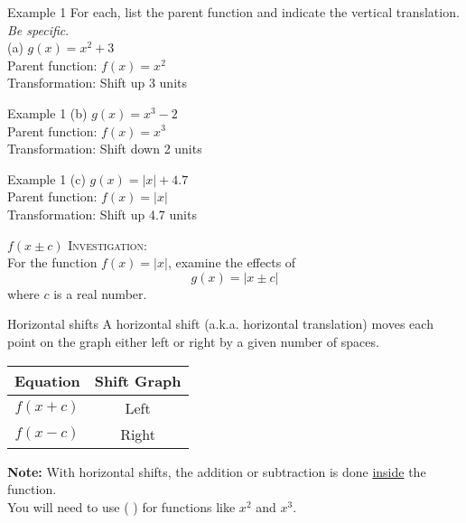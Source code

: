 \documentclass[t]{beamer}
\begin{document}
\begin{frame}{Example 1}
For each, list the parent function and indicate the vertical translation. \emph{Be specific}.	\newline\\	
(a) \quad $g(x) = x^2 + 3$	\newline\\	\pause
Parent function: $f(x) = x^2$	\newline\\	\pause
Transformation: Shift up 3 units
\end{frame}

\begin{frame}{Example 1}
(b) \quad $g(x) = x^3 - 2$	\newline\\	\pause
Parent function: $f(x) = x^3$	\newline\\	\pause
Transformation: Shift down 2 units
\end{frame}

\begin{frame}{Example 1}
(c) \quad $g(x) = |x| + 4.7$	\newline\\	\pause
Parent function: $f(x) = |x|$	\newline\\	\pause
Transformation: Shift up 4.7 units
\end{frame}

\begin{frame}{$f(x \pm c)$}
\textsc{Investigation:}	\newline\\

For the function $f(x) = |x|$, examine the effects of
\[g(x) = |x \pm c| \]
where $c$ is a real number.
\end{frame}

\begin{frame}{Horizontal shifts}
A \alert{horizontal shift} (a.k.a. \alert{horizontal translation}) moves each point on the graph either left or right by a given number of spaces.	\newline\\	\pause
\begin{center}
\setlength{\extrarowheight}{6pt}
\begin{tabular}{c|c}
\textbf{Equation}	&	\textbf{Shift Graph} \\ \hline
$f(x+c)$	& Left	\\[6pt]	\hline
$f(x-c)$ & Right \\
\end{tabular}
\end{center}
\vspace{8pt} \pause
{\color{blue}\textbf{Note:}} With horizontal shifts, the addition or subtraction is done \underline{inside} the function. \pause \newline\\

You will need to use ( ) for functions like $x^2$ and $x^3$.
\end{frame}
\end{document}
